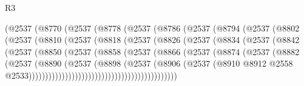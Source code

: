 \begin{lexlean}{R3}
\begin{coremodule}
                  (@2537
                    (@8770
                      (@2537
                        (@8778
                          (@2537
                            (@8786
                              (@2537
                                (@8794
                                  (@2537
                                    (@8802
                                      (@2537
                                        (@8810
                                          (@2537
                                            (@8818
                                              (@2537
                                                (@8826
                                                  (@2537
                                                    (@8834
                                                      (@2537
                                                        (@8842
                                                          (@2537
                                                            (@8850
                                                              (@2537
                                                                (@8858
                                                                  (@2537
                                                                    (@8866
                                                                      (@2537
                                                                        (@8874
                                                                          (@2537
                                                                            (@8882
                                                                              (@2537
                                                                                (@8890
                                                                                  (@2537
                                                                                    (@8898
                                                                                      (@2537
                                                                                        (@8906
                                                                                          (@2537
                                                                                            (@8910
                                                                                              @8912
                                                                                              @2558
                                                                                              @2533)))))))))))))))))))))))))))))))))))))))))))))

\end{coremodule}
\end{lexlean}
